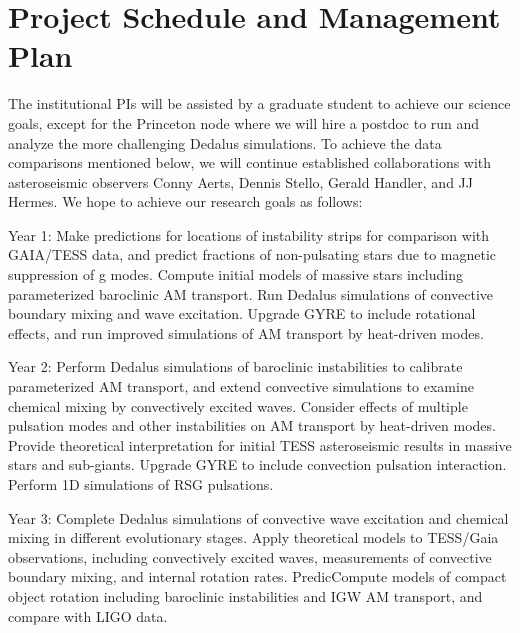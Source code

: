 \section{Project Schedule and Management Plan}

The institutional PIs will be assisted by a graduate student to achieve our science goals, except for the Princeton node where we will hire a postdoc to run and analyze the more challenging Dedalus simulations. To achieve the data comparisons mentioned below, we will continue established collaborations with asteroseismic observers Conny Aerts, Dennis Stello, Gerald Handler, and JJ Hermes. We hope to achieve our research goals as follows:

Year 1: Make predictions for locations of instability strips for comparison with GAIA/TESS data, and predict fractions of non-pulsating stars due to magnetic suppression of g modes. Compute initial models of massive stars including parameterized baroclinic AM transport. Run Dedalus simulations of convective boundary mixing and wave excitation. Upgrade GYRE to include rotational effects, and run improved simulations of AM transport by heat-driven modes. 

Year 2: Perform Dedalus simulations of baroclinic instabilities to calibrate parameterized AM transport, and extend convective simulations to examine chemical mixing by convectively excited waves. Consider effects of multiple pulsation modes and other instabilities on AM transport by heat-driven modes. Provide theoretical interpretation for initial TESS asteroseismic results in massive stars and sub-giants. Upgrade GYRE to include convection pulsation interaction. Perform 1D simulations of RSG pulsations.

Year 3: Complete Dedalus simulations of convective wave excitation and chemical mixing in different evolutionary stages. Apply theoretical models to TESS/Gaia observations, including convectively excited waves, measurements of convective boundary mixing, and internal rotation rates. PredicCompute models of compact object rotation including baroclinic instabilities and IGW AM transport, and compare with LIGO data.


